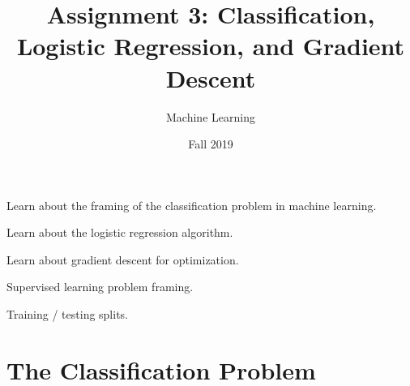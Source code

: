 \documentclass[assignment04_Solutions]{subfiles}
\title{Assignment 3: Classification, Logistic Regression, and Gradient Descent}
\author{Machine Learning}
\date{Fall 2019}
\begin{document}
\maketitle
\thispagestyle{firstpage}


\begin{learningobjectives}
\bi
\item Learn about the framing of the classification problem in machine learning.
\item Learn about the logistic regression algorithm.
\item Learn about gradient descent for optimization.
\ei
\end{learningobjectives}

\begin{priorknowledge}
\bi
\item Supervised learning problem framing.
\item Training / testing splits.
\ei
\end{priorknowledge}
\vspace{1em}

%
%


\section{The Classification Problem}
\end{document}
